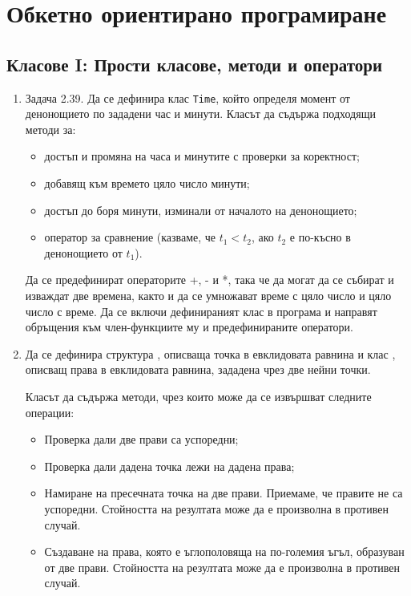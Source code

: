 \chapter{Обкетно ориентирано програмиране}

\setcounter{section}{8}

\section {Класове I: Прости класове, методи и оператори}

\begin{enumerate}


\item Задача 2.39.\cite{sbornik2} Да се дефинира клас \texttt{Time}, който определя момент от денонощието по зададени час и минути. Класът да съдържа подходящи методи за:

\begin{itemize}

 \item достъп и промяна на часа и минутите с проверки за коректност;
 \item добавящ към времето цяло число минути;
 \item достъп до боря минути, изминали от началото на денонощието;
 \item оператор за сравнение (казваме, че $t_1 < t_2$, ако $t_2$ е по-късно в денонощието от $t_1$).

\end{itemize}


Да се предефинират операторите +, - и *, така че да могат да се събират и изваждат две времена, както и да се умножават време с цяло число и цяло число с време. Да се включи дефинираният клас в програма и направят обръщения към член-функциите му и предефинираните оператори.

\item Да се дефинира структура , описваща точка в евклидовата равнина и клас  , описващ права в евклидовата равнина, зададена чрез две нейни точки.

Класът  да съдържа методи, чрез които може да се извършват следните операции:

\begin{itemize}
	\item Проверка дали две прави са успоредни;
	\item Проверка дали дадена точка лежи на дадена права;
	\item Намиране на пресечната точка на две прави. Приемаме, че правите не са успоредни. Стойността на резултата може да е произволна в противен случай.
	\item Създаване на права, която е ъглополовяща на по-големия ъгъл, образуван от две прави. Стойността на резултата може да е произволна в противен случай.
\end{itemize}


\end{enumerate}

